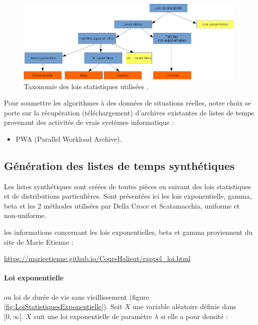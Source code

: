 \documentclass[a4paper,12pt]{report}
\theoremstyle{plain}				%
\theoremstyle{definition}				%
\newcommand\dcs{Della Croce et Scatamacchia\xspace}
\newcommand{\lp}[1]{\todo[author=LP,color=yellow,inline]{#1}}
\begin{document}
\begin{figure}
{\centering
\includegraphics[width=\columnwidth]{taxonomieLoisStatistiques.png}
\caption{Taxonomie des lois statistiques utilisées \cite{nielsen2009statistical}.}
\label{fig:taxonomieLoisStatistiques}
\par}
\end{figure}

Pour soumettre les algorithmes à des données de situations réelles,
notre choix se porte sur la récupération (téléchargement) d'archives
existantes de listes de temps provenant des activités de vrais systèmes informatique :
\begin{itemize}
	\item PWA (Parallel Workload Archive).
\end{itemize}


\subsection{Génération des listes de temps synthétiques}\label{ssec:instancesGenerationListesTempsSynthetiques}
Les listes synthétiques sont créées de toutes pièces en suivant des lois statistiques et de distributions particulières. Sont présentées ici les lois exponentielle, gamma, beta et les 2 méthodes utilisées par \dcs, uniforme et non-uniforme.

les informations concernant les lois exponentielles, beta et gamma proviennent du site de Marie Etienne :

\url{https://marieetienne.github.io/CoursHalieut/rappel_loi.html} 

\bigskip
\paragraph{Loi exponentielle} 
ou loi de durée de vie sans vieillissement (figure \ref{fig:LoiStatistiquesExponentielle}).
Soit $X$ une variable aléatoire définie dans $[0, \infty[$. $X$ suit une loi exponentielle de paramètre $\lambda$ si elle a pour densité :
\end{document}
